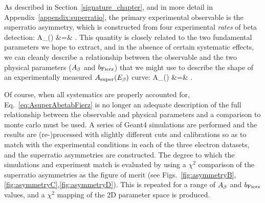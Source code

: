As described in Section~\ref{signature_chapter}, and in more detail in Appendix~\ref{appendix:superratio}, the primary experimental observable is the superratio asymmetry, which is constructed from four experimental \emph{rates} of beta detection:
\bea
A_{}(\Ebeta) 
&=& 
.
\eea
This quantity is closely related to the two fundamental parameters we hope to extract, 
and in the absence of certain systematic effects, we can cleanly describe a relationship between the observable
and the two physical parameters ($A_{\beta}$ and $b_{\mathrm{Fierz}}$) that we might use to describe the shape of an experimentally measured $A_{\mathrm{super}}(E_{\beta})$ curve:
\bea
A_{}(\Ebeta) 
&=&
.
\label{eq:AsuperAbetabFierz}
\eea

Of course, when all systematics are properly accounted for, Eq.~\ref{eq:AsuperAbetabFierz} is no longer an adequate description of the full relationship between the observable and physical parameters and a comparison to monte carlo must be used.  A series of Geant4 simulations are performed and the results are (re-)processed with slightly different cuts and calibrations so as to match with the experimental conditions in each of the three electron datasets, and the superratio asymmetries are constructed.  The degree to which the simulations and experiment match is evaluated by using a $\chi^2$ comparison of the superratio asymmetries as the figure of merit (see Figs.~\ref{fig:asymmetryB},\ref{fig:asymmetryC},\ref{fig:asymmetryD}).  This is repeated for a range of $A_{\beta}$ and $b_{\mathrm{Fierz}}$ values, and a $\chi^2$ mapping of the 2D parameter space is produced.  

